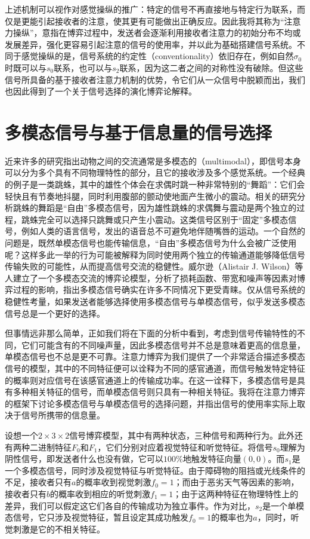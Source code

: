 \documentclass[12pt]{ctexart}  %
\begin{document}
上述机制可以视作对感觉操纵的推广：特定的信号不再直接地与特定行为联系，而仅是更能引起接收者的注意，使其更有可能做出正确反应。因此我将其称为“注意力操纵”，意指在博弈过程中，发送者会逐渐利用接收者注意力的初始分布不均或发展差异，强化更容易引起注意的信号的使用率，并以此为基础搭建信号系统。不同于感觉操纵的是，信号系统的约定性（conventionality）依旧存在，例如自然$\sigma_0$时既可以与$s_0$联系，也可以与$s_2$联系，因为这二者之间的对称性没有破除。但这些信号所具备的基于接收者注意力机制的优势，令它们从一众信号中脱颖而出，我们也因此得到了一个关于信号选择的演化博弈论解释。

\section{多模态信号与基于信息量的信号选择}
近来许多的研究指出动物之间的交流通常是多模态的（multimodal），即信号本身可以分为多个具有不同物理特性的部分，且它的接收涉及多个感觉系统。\cite{multimodal}一个经典的例子是一类跳蛛，其中的雄性个体会在求偶时跳一种非常特别的“舞蹈”：它们会轻快且有节奏地抖腿，同时利用腹部的颤动使地面产生微小的震动。相关的研究分析跳蛛的舞蹈是“自由”多模态信号，因为雄性跳蛛的求偶舞与震动是两个独立的过程，跳蛛完全可以选择只跳舞或只产生小震动。\cite{spider}这类信号区别于“固定”多模态信号，例如人类的语言信号，发出的语音总不可避免地伴随嘴唇的运动。一个自然的问题是，既然单模态信号也能传输信息，“自由”多模态信号为什么会被广泛使用呢？这样多此一举的行为可能被解释为同时使用两个独立的传输通道能够降低信号传输失败的可能性，从而提高信号交流的稳健性。威尔逊（Alistair J. Wilson）等人建立了一个多模态交流的博弈论模型，分析了损耗函数、带宽和噪声等因素对博弈过程的影响，指出多模态信号确实在许多不同情况下更受青睐。\cite{multi_game}仅从信号系统的稳健性考量，如果发送者能够选择使用多模态信号与单模态信号，似乎发送多模态信号总是一个更好的选择。

但事情远非那么简单，正如我们将在下面的分析中看到，考虑到信号传输特性的不同，它们可能含有的不同噪声量，因此多模态信号并不总是意味着更高的信息量，单模态信号也不总是更不可靠。注意力博弈为我们提供了一个非常适合描述多模态信号的模型，其中的不同特征便可以诠释为不同的感官通道，而信号触发特定特征的概率则对应信号在该感官通道上的传输成功率。在这一诠释下，多模态信号是具有多种相关特征的信号，而单模态信号则只具有一种相关特征。我将在注意力博弈的框架下讨论多模态信号与单模态信号的选择问题，并指出信号的使用率实际上取决于信号所携带的信息量。

设想一个$2\times 3\times 2$信号博弈模型，其中有两种状态，三种信号和两种行为。此外还有两种二进制特征$F_0$和$F_1$，它们分别对应着视觉特征和听觉特征。将信号$s_0$理解为阴性信号，即发送者什么也没有做，它可以$100\%$地触发特征向量$(0,0)$。而$s_1$是一个多模态信号，同时涉及视觉特征与听觉特征。由于障碍物的阻挡或光线条件的不足，接收者只有$a$的概率收到视觉刺激$f_0=1$；而由于恶劣天气等因素的影响，接收者只有$b$的概率收到相应的听觉刺激$f_1=1$；由于这两种特征在物理特性上的差异，我们可以假定这它们各自的传输成功为独立事件。作为对比，$s_2$是一个单模态信号，它只涉及视觉特征，暂且设定其成功触发$f_0=1$的概率也为$a$，同时，听觉刺激是它的不相关特征。
\end{document}

